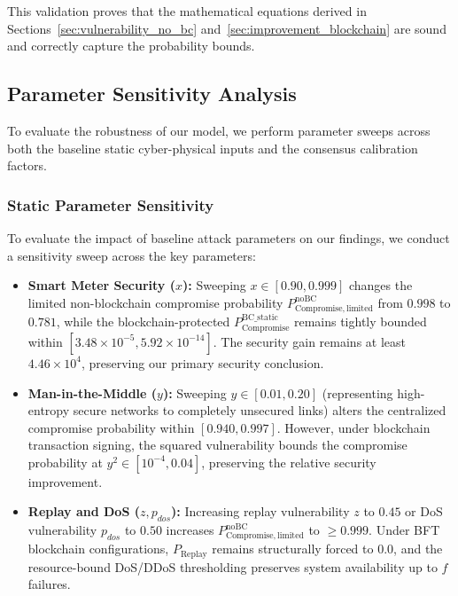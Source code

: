 \documentclass[10pt,twocolumn,journal]{IEEEtran}
\begin{document}
This validation proves that the mathematical equations derived in Sections~\ref{sec:vulnerability_no_bc} and~\ref{sec:improvement_blockchain} are sound and correctly capture the probability bounds.

\subsection{Parameter Sensitivity Analysis}
\label{sec:parameter_sensitivity}

To evaluate the robustness of our model, we perform parameter sweeps across both the baseline static cyber-physical inputs and the consensus calibration factors.

\subsubsection{Static Parameter Sensitivity}
To evaluate the impact of baseline attack parameters on our findings, we conduct a sensitivity sweep across the key parameters:
\begin{itemize}[leftmargin=*]
    \item \textbf{Smart Meter Security ($x$):} Sweeping $x \in [0.90, 0.999]$ changes the limited non-blockchain compromise probability $P_{\mathrm{Compromise, limited}}^{\mathrm{noBC}}$ from $0.998$ to $0.781$, while the blockchain-protected $P_{\mathrm{Compromise}}^{\mathrm{BC\_static}}$ remains tightly bounded within $[3.48 \times 10^{-5}, 5.92 \times 10^{-14}]$. The security gain remains at least $4.46 \times 10^4$, preserving our primary security conclusion.
    \item \textbf{Man-in-the-Middle ($y$):} Sweeping $y \in [0.01, 0.20]$ (representing high-entropy secure networks to completely unsecured links) alters the centralized compromise probability within $[0.940, 0.997]$. However, under blockchain transaction signing, the squared vulnerability bounds the compromise probability at $y^2 \in [10^{-4}, 0.04]$, preserving the relative security improvement.
    \item \textbf{Replay and DoS ($z, p_{dos}$):} Increasing replay vulnerability $z$ to $0.45$ or DoS vulnerability $p_{dos}$ to $0.50$ increases $P_{\mathrm{Compromise, limited}}^{\mathrm{noBC}}$ to $\geq 0.999$. Under BFT blockchain configurations, $P_{\mathrm{Replay}}$ remains structurally forced to $0.0$, and the resource-bound DoS/DDoS thresholding preserves system availability up to $f$ failures.
\end{itemize}
\end{document}
